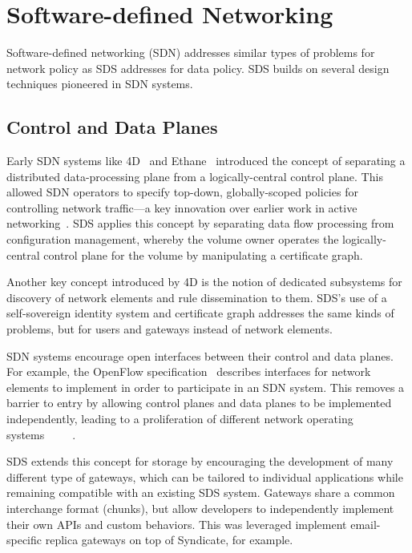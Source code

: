 \section{Software-defined Networking}

Software-defined networking (SDN) addresses similar types of problems for
network policy as SDS addresses for data policy.  SDS builds on several design
techniques pioneered in SDN systems.

\subsection{Control and Data Planes}

Early SDN systems like
4D~\cite{4D} and Ethane~\cite{ethane} introduced the concept of separating a
distributed data-processing plane from a logically-central control plane.
This allowed SDN operators to specify top-down, globally-scoped policies for controlling
network traffic---a key innovation over earlier work in active
networking~\cite{road-to-sdn}.  SDS applies this concept by
separating data flow processing from configuration management, whereby the
volume owner operates the logically-central control plane for the
volume by manipulating a certificate graph.

Another key concept introduced by 4D is the notion of
dedicated subsystems for discovery of network elements and rule dissemination to
them.  SDS's use of a self-sovereign identity system and certificate graph
addresses the same kinds of problems, but for users and gateways instead of network
elements.

SDN systems encourage open interfaces between their control and data planes.
For example, the OpenFlow specification~\cite{openflow} describes interfaces for
network elements to implement in order to participate in an SDN system.
This removes a barrier to entry by allowing control planes and data planes
to be implemented independently, leading to a proliferation of different network operating
systems~\cite{onos}~\cite{NOX}~\cite{stratum}~\cite{bigswitch}~\cite{road-to-sdn}.

SDS extends this concept for 
storage by encouraging the development of many different type of gateways, which
can be tailored to individual applications while remaining compatible with an
existing SDS system.  Gateways share a common interchange format (chunks), but
allow developers to independently implement their own APIs and custom behaviors.
This was leveraged implement email-specific replica
gateways on top of Syndicate, for example.

